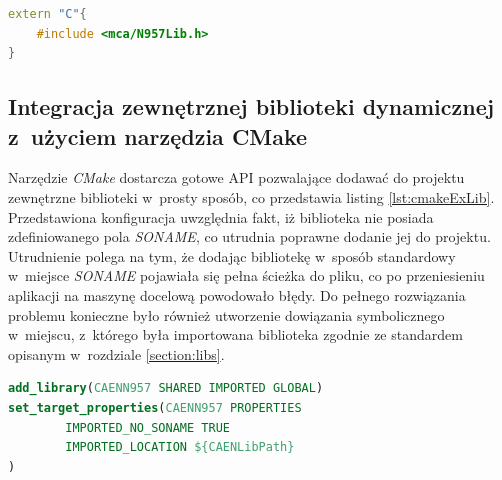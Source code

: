 \begin{lstlisting}[language=c++, caption={Wykorzystanie konstrukcji \lstinline{extern "C"} w~celu integracji biblioteki napisanej w~języku C z~komponentem \textbf{mca-lib}}, label={lst:externCC}]
extern "C"{ 
    #include <mca/N957Lib.h>
}
\end{lstlisting}

\newpage

\subsection{Integracja zewnętrznej biblioteki dynamicznej z~użyciem narzędzia CMake}
Narzędzie \textit{CMake} dostarcza gotowe API pozwalające dodawać do projektu zewnętrzne biblioteki w~prosty sposób, co przedstawia listing \ref{lst:cmakeExLib}. Przedstawiona konfiguracja uwzględnia fakt, iż biblioteka nie posiada zdefiniowanego pola \textit{SONAME}, co utrudnia poprawne dodanie jej do projektu. Utrudnienie polega na tym, że dodając bibliotekę w~sposób standardowy w~miejsce \textit{SONAME} pojawiała się pełna ścieżka do pliku, co po przeniesieniu aplikacji na maszynę docelową powodowało błędy. Do pełnego rozwiązania problemu konieczne było również utworzenie dowiązania symbolicznego w~miejscu, z~którego była importowana biblioteka zgodnie ze standardem opisanym w~rozdziale \ref{section:libs}.

\begin{lstlisting}[language=cmake, caption={Dodanie zewnętrznej biblioteki do projektu za pomocą narzędzia \textit{CMake}}, label={lst:cmakeExLib}]
add_library(CAENN957 SHARED IMPORTED GLOBAL)
set_target_properties(CAENN957 PROPERTIES
        IMPORTED_NO_SONAME TRUE
        IMPORTED_LOCATION ${CAENLibPath}
)
\end{lstlisting}
